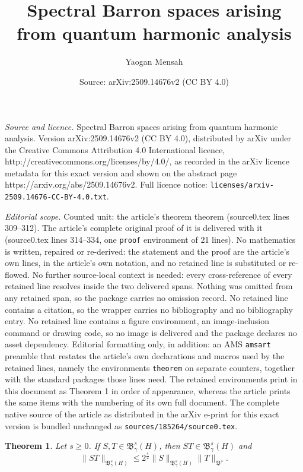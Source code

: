 \documentclass[10pt,a4paper]{amsart}
\title{Spectral Barron spaces arising from quantum harmonic analysis}
\author{Yaogan Mensah}
\date{Source: arXiv:2509.14676v2 (CC BY 4.0)}
\newtheorem{theorem}{Theorem}
\begin{document}
\maketitle

\noindent\emph{Source and licence.} Spectral Barron spaces arising from quantum harmonic analysis. Version arXiv:2509.14676v2 (CC BY 4.0), distributed by arXiv under the Creative Commons Attribution 4.0 International licence, http://creativecommons.org/licenses/by/4.0/, as recorded in the arXiv licence metadata for this exact version and shown on the abstract page https://arxiv.org/abs/2509.14676v2. Full licence notice: \texttt{licenses/arxiv-2509.14676-CC-BY-4.0.txt}.\par\smallskip

\noindent\textit{Editorial scope.} Counted unit: the article's theorem theorem (source0.tex lines 309--312). The article's complete original proof of it is delivered with it (source0.tex lines 314--334, one \texttt{proof} environment of 21 lines). No mathematics is written, repaired or re-derived: the statement and the proof are the article's own lines, in the article's own notation, and no retained line is substituted or re-flowed.  No further source-local context is needed: every cross-reference of every retained line resolves inside the two delivered spans.  Nothing was omitted from any retained span, so the package carries no omission record.  No retained line contains a citation, so the wrapper carries no bibliography and no bibliography entry.  No retained line contains a figure environment, an image-inclusion command or drawing code, so no image is delivered and the package declares no asset dependency.  Editorial formatting only, in addition: an AMS \texttt{amsart} preamble that restates the article's own declarations and macros used by the retained lines, namely the environments \texttt{theorem} on separate counters, together with the standard packages those lines need.  The retained environments print in this document as Theorem 1 in order of appearance, whereas the article prints the same items with the numbering of its own full document.  The complete native source of the article as distributed in the arXiv e-print for this exact version is bundled unchanged as \texttt{sources/185264/source0.tex}.
\begin{theorem}
Let $s\geq 0$. If $S,T\in \mathfrak{B}^s_\gamma(H)$, then $ST \in \mathfrak{B}^s_\gamma(H)$ and 
$$\|ST\|_{\mathfrak{B}^s_\gamma(H)}\leq 2^{\frac{s}{2}}\|S\|_{\mathfrak{B}^s_\gamma(H)} \|T\|_{\mathfrak{B}^{s}}.$$
\end{theorem}
\end{document}
